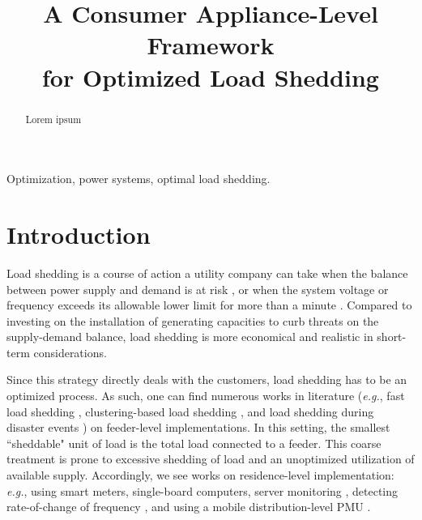 \documentclass[conference, a4paper]{IEEEtran}
\begin{document}
\title{A Consumer Appliance-Level Framework\\for Optimized Load Shedding}

\author{
}

\maketitle


\begin{abstract}
Lorem ipsum
\end{abstract}

\begin{IEEEkeywords}
Optimization, power systems, optimal load shedding.
\end{IEEEkeywords}


\section{Introduction}
\label{sec: Introduction}

Load shedding is a course of action a utility company can take
when the balance between power supply and demand is at risk \cite{Jabian2018},
or when the system voltage or frequency exceeds its allowable lower limit for more than a minute \cite{GMC2016}.
Compared to investing on the installation of generating capacities to curb threats on the supply-demand balance,
load shedding is more economical and realistic in short-term considerations.

Since this strategy directly deals with the customers, load shedding has to be an optimized process.
As such, one can find numerous works in literature
(\textit{e.g.},
fast load shedding \cite{Wester2014},
clustering-based load shedding \cite{Potel2019}, and
load shedding during disaster events \cite{Babaei2020})
on feeder-level implementations.
In this setting, the smallest ``sheddable" unit of load is the total load connected to a feeder.
This coarse treatment is prone to excessive shedding of load and an unoptimized utilization of available supply.
Accordingly, we see works on residence-level implementation:
\textit{e.g.},
using smart meters, single-board computers, server monitoring \cite{Bhattacherjee2019},
detecting rate-of-change of frequency \cite{Sigrist2015},
and using a mobile distribution-level PMU \cite{Yao2020}.
\end{document}
